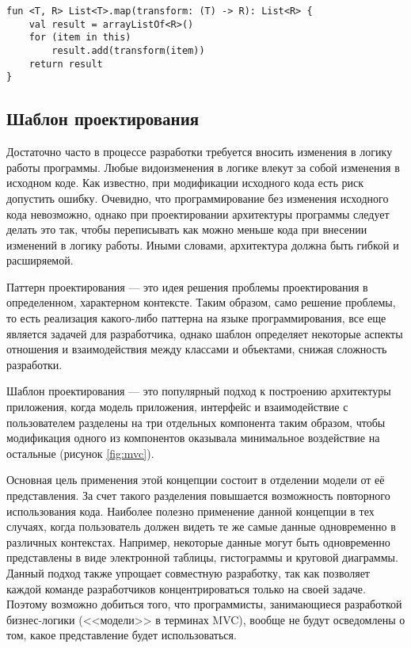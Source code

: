 \begin{lstlisting}[style = ktstyle, 
           caption = {Реализация популярной функции высшего порядка <<map>> на языке \kt{}},
           label = {lst:kt_map}]
fun <T, R> List<T>.map(transform: (T) -> R): List<R> {
    val result = arrayListOf<R>()
    for (item in this)
        result.add(transform(item))
    return result
}
\end{lstlisting}



\subsection{Шаблон проектирования \mvc{}}

Достаточно часто в процессе разработки требуется вносить изменения в логику
работы программы. Любые видоизменения в логике влекут за собой изменения в
исходном коде. Как известно, при модификации исходного кода есть риск допустить
ошибку. Очевидно, что программирование без изменения исходного кода невозможно,
однако при проектировании архитектуры программы следует делать это так, чтобы
переписывать как можно меньше кода при внесении изменений в логику работы. Иными
словами, архитектура должна быть гибкой и расширяемой.

Паттерн проектирования --- это идея решения проблемы проектирования в
определенном, характерном контексте. Таким образом, само решение проблемы, то
есть реализация какого-либо паттерна на языке программирования, все еще является
задачей для разработчика, однако шаблон определяет некоторые аспекты отношения и
взаимодействия между классами и объектами, снижая сложность разработки.

Шаблон проектирования \mvc{} --- это популярный подход к построению архитектуры
приложения, когда модель приложения, интерфейс и взаимодействие с пользователем
разделены на три отдельных компонента таким образом, чтобы модификация одного из
компонентов оказывала минимальное воздействие на остальные (рисунок
\ref{fig:mvc}).

Основная цель применения этой концепции состоит в отделении модели от её
представления. За счет такого разделения повышается возможность повторного
использования кода. Наиболее полезно применение данной концепции в тех случаях,
когда пользователь должен видеть те же самые данные одновременно в различных
контекстах. Например, некоторые данные могут быть одновременно представлены в
виде электронной таблицы, гистограммы и круговой диаграммы.
Данный подход также упрощает совместную разработку, так как позволяет каждой
команде разработчиков концентрироваться только на своей задаче.
Поэтому возможно добиться того, что программисты, занимающиеся разработкой
бизнес-логики (<<модели>> в терминах MVC), вообще не будут осведомлены о том,
какое представление будет использоваться.

